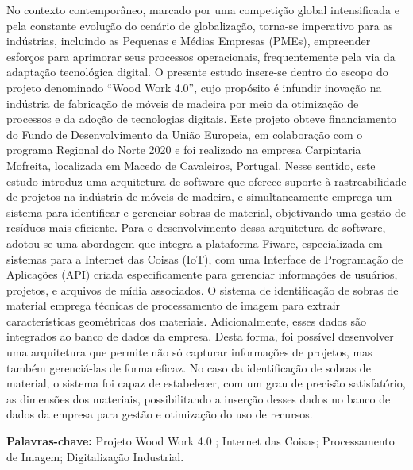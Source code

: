 

No contexto contemporâneo, marcado por uma competição global intensificada e pela constante evolução do cenário de globalização, torna-se imperativo para as indústrias, incluindo as Pequenas e Médias Empresas (PMEs), empreender esforços para aprimorar seus processos operacionais, frequentemente pela via da adaptação tecnológica digital. O presente estudo insere-se dentro do escopo do projeto denominado “Wood Work 4.0”, cujo propósito é infundir inovação na indústria de fabricação de móveis de madeira por meio da otimização de processos e da adoção de tecnologias digitais. Este projeto obteve financiamento do Fundo de Desenvolvimento da União Europeia, em colaboração com o programa Regional do Norte 2020 e foi realizado na empresa Carpintaria Mofreita, localizada em Macedo de Cavaleiros, Portugal. Nesse sentido, este estudo introduz uma arquitetura de software que oferece suporte à rastreabilidade de projetos na indústria de móveis de madeira, e simultaneamente emprega um sistema para identificar e gerenciar sobras de material, objetivando uma gestão de resíduos mais eficiente. Para o desenvolvimento dessa arquitetura de software, adotou-se uma abordagem que integra a plataforma Fiware, especializada em sistemas para a Internet das Coisas (IoT), com uma Interface de Programação de Aplicações (API) criada especificamente para gerenciar informações de usuários, projetos, e arquivos de mídia associados. O sistema de identificação de sobras de material emprega técnicas de processamento de imagem para extrair características geométricas dos materiais. Adicionalmente, esses dados são integrados ao banco de dados da empresa. Desta forma, foi possível desenvolver uma arquitetura que permite não só capturar informações de projetos, mas também gerenciá-las de forma eficaz. No caso da identificação de sobras de material, o sistema foi capaz de estabelecer, com um grau de precisão satisfatório, as dimensões dos materiais, possibilitando a inserção desses dados no banco de dados da empresa para gestão e otimização do uso de recursos.

\bigskip

\noindent \textbf{Palavras-chave:} Projeto Wood Work 4.0 ;  Internet das Coisas; Processamento de Imagem; Digitalização Industrial.
